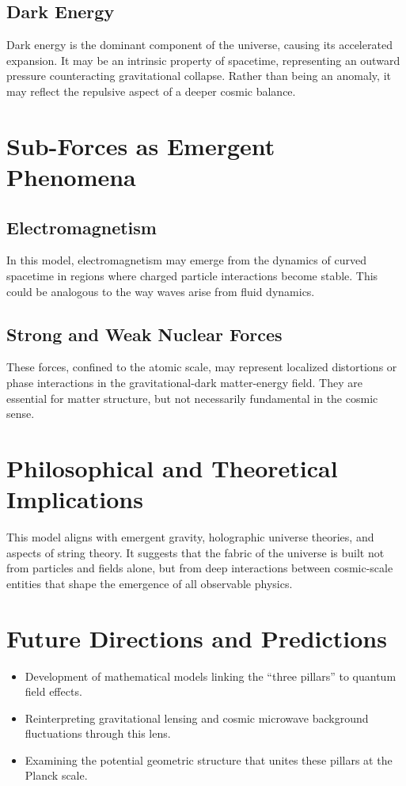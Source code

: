\documentclass[aps,prd,twocolumn,superscriptaddress,nofootinbib]{revtex4-2}
\begin{document}
\subsection{Dark Energy}
Dark energy is the dominant component of the universe, causing its accelerated expansion. It may be an intrinsic property of spacetime, representing an outward pressure counteracting gravitational collapse. Rather than being an anomaly, it may reflect the repulsive aspect of a deeper cosmic balance.

\section{Sub-Forces as Emergent Phenomena}

\subsection{Electromagnetism}
In this model, electromagnetism may emerge from the dynamics of curved spacetime in regions where charged particle interactions become stable. This could be analogous to the way waves arise from fluid dynamics.

\subsection{Strong and Weak Nuclear Forces}
These forces, confined to the atomic scale, may represent localized distortions or phase interactions in the gravitational-dark matter-energy field. They are essential for matter structure, but not necessarily fundamental in the cosmic sense.

\section{Philosophical and Theoretical Implications}
This model aligns with emergent gravity, holographic universe theories, and aspects of string theory. It suggests that the fabric of the universe is built not from particles and fields alone, but from deep interactions between cosmic-scale entities that shape the emergence of all observable physics.

\section{Future Directions and Predictions}
\begin{itemize}
  \item Development of mathematical models linking the ``three pillars'' to quantum field effects.
  \item Reinterpreting gravitational lensing and cosmic microwave background fluctuations through this lens.
  \item Examining the potential geometric structure that unites these pillars at the Planck scale.
\end{itemize}
\end{document}
